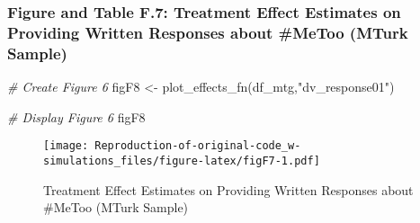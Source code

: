 \documentclass[
]{article}
\newenvironment{Shaded}{\begin{snugshade}}{\end{snugshade}}
\newcommand{\CommentTok}[1]{\textcolor[rgb]{0.56,0.35,0.01}{\textit{#1}}}
\newcommand{\FunctionTok}[1]{\textcolor[rgb]{0.00,0.00,0.00}{#1}}
\newcommand{\NormalTok}[1]{#1}
\newcommand{\OtherTok}[1]{\textcolor[rgb]{0.56,0.35,0.01}{#1}}
\newcommand{\SpecialCharTok}[1]{\textcolor[rgb]{0.00,0.00,0.00}{#1}}
\newcommand{\StringTok}[1]{\textcolor[rgb]{0.31,0.60,0.02}{#1}}
\begin{document}
\hypertarget{figure-and-table-f.7-treatment-effect-estimates-on-providing-written-responses-about-metoo-mturk-sample}{%
\subsubsection{Figure and Table F.7: Treatment Effect Estimates on
Providing Written Responses about \#MeToo (MTurk
Sample)}\label{figure-and-table-f.7-treatment-effect-estimates-on-providing-written-responses-about-metoo-mturk-sample}}

\begin{Shaded}
\begin{Highlighting}[]
\CommentTok{\# Create Figure 6}
\NormalTok{figF8 }\OtherTok{\textless{}{-}} \FunctionTok{plot\_effects\_fn}\NormalTok{(df\_mtg,}\StringTok{"dv\_response01"}\NormalTok{) }

\CommentTok{\# Display Figure 6}
\NormalTok{figF8 }
\end{Highlighting}
\end{Shaded}

\begin{figure}
\centering
\texttt{[image: Reproduction-of-original-code\_w-simulations\_files/figure-latex/figF7-1.pdf]}
\caption{Treatment Effect Estimates on Providing Written Responses about
\#MeToo (MTurk Sample)}
\end{figure}

\begin{Shaded}
\end{Shaded}
\end{document}
